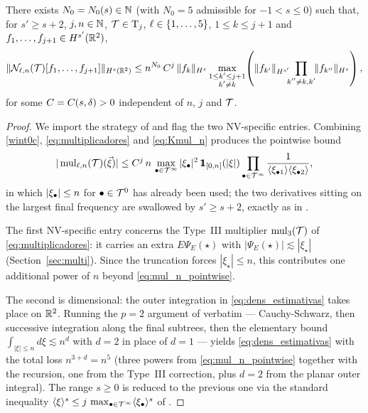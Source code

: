 \begin{lemma}\label{lem:dens_estimativas}
There exists $N_0=N_0(s)\in\mathbb{N}$ (with $N_0=5$ admissible for
$-1<s\le 0$) such that, for $s'\ge s+2$, $j,n\in\mathbb{N}$, $\mathcal{T}\in\mathrm{T}_j$,
$\ell\in\{1,\dots,5\}$, $1\le k\le j+1$ and
$f_1,\dots,f_{j+1}\in H^{s'}(\mathbb{R}^2)$,
\begin{equation}\label{eq:dens_estimativas}
\|\mathcal{N}_{\ell,n}(\mathcal{T})[f_1,\dots,f_{j+1}]\|_{H^s(\mathbb{R}^2)}
\le n^{N_0}\, C^j\, \|f_k\|_{H^s}
\max_{\substack{1\le k'\le j+1\\ k'\ne k}}\!\left(
\|f_{k'}\|_{H^{s'}}\!\!\!\prod_{\substack{k''\ne k,k'}}\!\!\|f_{k''}\|_{H^s}
\right),
\end{equation}
for some $C=C(s,\delta)>0$ independent of $n$, $j$ and $\mathcal{T}$.
\end{lemma}

\begin{proof}
We import the strategy of \cite[Lemma~5.2]{chcora} and flag the two
NV-specific entries. Combining \eqref{wint0c},
\eqref{eq:multiplicadores} and \eqref{eq:Kmul_n} produces the
pointwise bound
\begin{equation}\label{eq:mul_n_pointwise}
|\mul_{\l,n}(\TT)(\vec\xi)|
\le C^j\, n\, \max_{\bul\in\TT^\infty}|\xi_\bul|^2\,
\ind_{[0,n]}(|\xi|)
\prod_{\bul\in\TT^\infty}\frac{1}{\jap{\xi_{\bul1}}\jap{\xi_{\bul2}}},
\end{equation}
in which $|\xi_\bullet|\le n$ for $\bullet\in\mathcal{T}^0$ has already been used;
the two derivatives sitting on the largest final frequency are
swallowed by $s'\ge s+2$, exactly as in \cite{chcora}.

The first NV-specific entry concerns the Type~III multiplier
$\operatorname{mul}_3(\mathcal{T})$ of \eqref{eq:multiplicadores}: it carries an extra
$E\Psi_E(\star)$ with $|\Psi_E(\star)|\lesssim|\xi_\star|$
(Section~\ref{sec:multi}). Since the truncation forces
$|\xi_\star|\le n$, this contributes one additional power of $n$
beyond \eqref{eq:mul_n_pointwise}.

The second is dimensional: the outer integration in
\eqref{eq:dens_estimativas} takes place on $\mathbb{R}^2$. Running the
$p=2$ argument of \cite[Lemma~5.2]{chcora} verbatim ---
Cauchy-Schwarz, then successive integration along the final
subtrees, then the elementary bound
$\int_{|\xi|\le n}d\xi\lesssim n^d$ with $d=2$ in place of $d=1$ ---
yields \eqref{eq:dens_estimativas} with the total loss
$n^{3+d}=n^5$ (three powers from \eqref{eq:mul_n_pointwise} together
with the recursion, one from the Type~III correction, plus $d=2$
from the planar outer integral). The range $s\ge 0$ is reduced to
the previous one via the standard inequality
$\langle \xi \rangle^s\le j\,\max_{\bullet\in\mathcal{T}^\infty}\langle \xi_\bullet \rangle^s$
of \cite[Lemma~5.2]{chcora}.
\end{proof}

